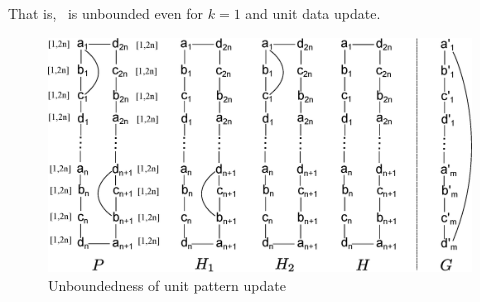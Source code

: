 \vspace{-1.5ex}
That is, \dynteamF\, is unbounded even for $k=1$ and unit data update.

\vspace{-1ex}
\begin{figure}[h!]
\label{fig-inc-complexity-pattern}
\begin{center}
\includegraphics[scale=0.31]{./fig/inc-complexity-proof-pattern.eps}
\end{center}
\vspace{-3ex}
\caption{Unboundedness of unit pattern update}
\vspace{-1.5ex}
\end{figure}


